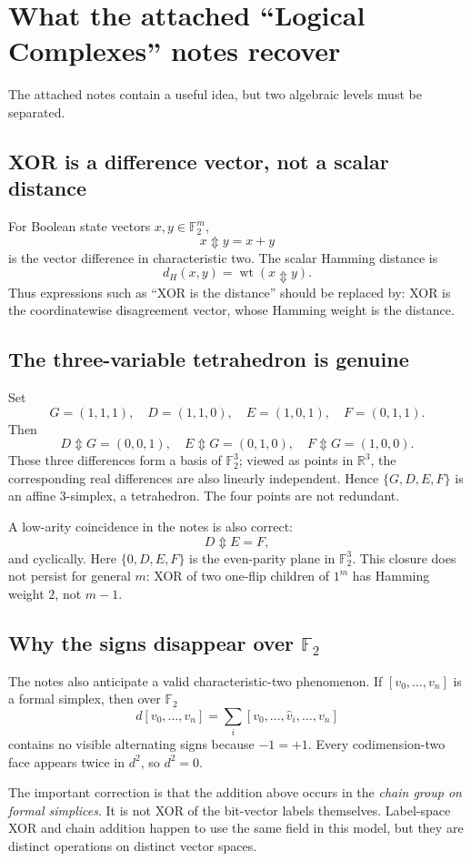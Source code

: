 \documentclass[11pt]{article}
\newcommand{\Ftwo}{\mathbb F_2}
\newcommand{\wt}{\operatorname{wt}}
\newcommand{\Updown}{\mathbin{\Updownarrow}}
\begin{document}
\section{What the attached ``Logical Complexes'' notes recover}

The attached notes contain a useful idea, but two algebraic levels must be separated.

\subsection{XOR is a difference vector, not a scalar distance}
For Boolean state vectors $x,y\in\Ftwo^m$,
\[
x\Updown y=x+y
\]
is the vector difference in characteristic two.  The scalar Hamming distance is
\[
d_H(x,y)=\wt(x\Updown y).
\]
Thus expressions such as ``XOR is the distance'' should be replaced by: XOR is the coordinatewise disagreement vector, whose Hamming weight is the distance.

\subsection{The three-variable tetrahedron is genuine}
Set
\[
G=(1,1,1),\quad D=(1,1,0),\quad E=(1,0,1),\quad F=(0,1,1).
\]
Then
\[
D\Updown G=(0,0,1),\quad E\Updown G=(0,1,0),\quad F\Updown G=(1,0,0).
\]
These three differences form a basis of $\Ftwo^3$; viewed as points in $\mathbb R^3$, the corresponding real differences are also linearly independent.  Hence $\{G,D,E,F\}$ is an affine $3$-simplex, a tetrahedron.  The four points are not redundant.

A low-arity coincidence in the notes is also correct:
\[
D\Updown E=F,
\]
and cyclically.  Here $\{0,D,E,F\}$ is the even-parity plane in $\Ftwo^3$.  This closure does not persist for general $m$: XOR of two one-flip children of $1^m$ has Hamming weight $2$, not $m-1$.

\subsection{Why the signs disappear over $\Ftwo$}
The notes also anticipate a valid characteristic-two phenomenon.  If $[v_0,\dots,v_n]$ is a formal simplex, then over $\Ftwo$
\[
d[v_0,\dots,v_n]
=\sum_i[v_0,\dots,\widehat v_i,\dots,v_n]
\]
contains no visible alternating signs because $-1=+1$.  Every codimension-two face appears twice in $d^2$, so $d^2=0$.

The important correction is that the addition above occurs in the \emph{chain group on formal simplices}.  It is not XOR of the bit-vector labels themselves.  Label-space XOR and chain addition happen to use the same field in this model, but they are distinct operations on distinct vector spaces.
\end{document}
